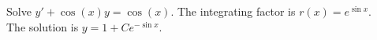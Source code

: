 {Solve $y' + \cos (x) y = \cos(x)$.}
{The integrating factor is $r(x)=e^{\sin x}$.\\
The solution is $y=1+Ce^{-\sin x}$.}